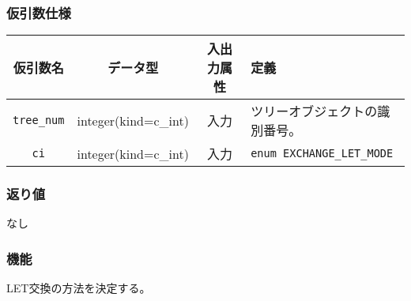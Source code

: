 \subsubsection*{仮引数仕様}
\begin{table}[h]
\begin{tabularx}{\linewidth}{cccX}
\toprule
\rowcolor{Snow2}
仮引数名 & データ型 & 入出力属性 & 定義 \\
\midrule
\verb|tree_num|  & integer(kind=c\_int)   & 入力     & ツリーオブジェクトの識別番号。\\
\texttt{ci} & integer(kind=c\_int) & 入力 & {\tt enum
  EXCHANGE\_LET\_MODE} \\
\bottomrule
\end{tabularx}
\end{table}

\subsubsection*{返り値}
なし

\subsubsection*{機能}

LET交換の方法を決定する。


\clearpage

